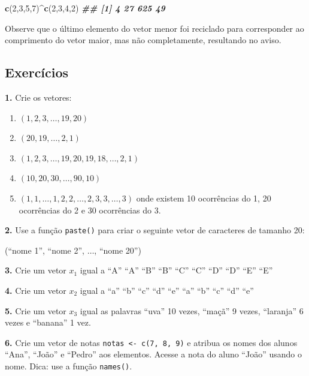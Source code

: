 \documentclass[
]{book}
\newenvironment{Shaded}{\begin{snugshade}}{\end{snugshade}}
\newcommand{\DecValTok}[1]{\textcolor[rgb]{0.00,0.00,0.81}{#1}}
\newcommand{\DocumentationTok}[1]{\textcolor[rgb]{0.56,0.35,0.01}{\textbf{\textit{#1}}}}
\newcommand{\FunctionTok}[1]{\textcolor[rgb]{0.13,0.29,0.53}{\textbf{#1}}}
\newcommand{\NormalTok}[1]{#1}
\newcommand{\SpecialCharTok}[1]{\textcolor[rgb]{0.81,0.36,0.00}{\textbf{#1}}}
\begin{document}
\begin{Shaded}
\begin{Highlighting}[]
\FunctionTok{c}\NormalTok{(}\DecValTok{2}\NormalTok{,}\DecValTok{3}\NormalTok{,}\DecValTok{5}\NormalTok{,}\DecValTok{7}\NormalTok{)}\SpecialCharTok{\^{}}\FunctionTok{c}\NormalTok{(}\DecValTok{2}\NormalTok{,}\DecValTok{3}\NormalTok{,}\DecValTok{4}\NormalTok{,}\DecValTok{2}\NormalTok{)}
\DocumentationTok{\#\# [1]   4  27 625  49}
\end{Highlighting}
\end{Shaded}

Observe que o último elemento do vetor menor foi reciclado para
corresponder ao comprimento do vetor maior, mas não completamente,
resultando no aviso.

\subsection{Exercícios}\label{exercuxedcios-1}

\textbf{1.} Crie os vetores:

\begin{enumerate}
\def\labelenumi{(\alph{enumi})}
\item
  \((1,2,3,\ldots,19,20)\)
\item
  \((20,19,\ldots,2,1)\)
\item
  \((1,2,3,\ldots,19,20,19,18,\ldots,2,1)\)
\item
  \((10,20,30,\ldots,90,10)\)
\item
  \((1,1,\ldots,1,2,2,\ldots,2,3,3,\ldots,3)\) onde existem 10
  ocorrências do 1, 20 ocorrências do 2 e 30 ocorrências do 3.
\end{enumerate}

\textbf{2.} Use a função \texttt{paste()} para criar o seguinte vetor de caracteres
de tamanho 20:

(``nome 1'', ``nome 2'', \(\ldots\), ``nome 20'')

\textbf{3.} Crie um vetor \(x_1\) igual a ``A'' ``A'' ``B'' ``B'' ``C'' ``C'' ``D'' ``D'' ``E''
``E''

\textbf{4.} Crie um vetor \(x_2\) igual a ``a'' ``b'' ``c'' ``d'' ``e'' ``a'' ``b'' ``c'' ``d''
``e''

\textbf{5.} Crie um vetor \(x_3\) igual as palavras ``uva'' 10 vezes, ``maçã'' 9
vezes, ``laranja'' 6 vezes e ``banana'' 1 vez.

\textbf{6.} Crie um vetor de notas \texttt{notas\ \textless{}-\ c(7,\ 8,\ 9)} e atribua os nomes
dos alunos ``Ana'', ``João'' e ``Pedro'' aos elementos. Acesse a nota do aluno
``João'' usando o nome. Dica: use a função \texttt{names()}.
\end{document}
